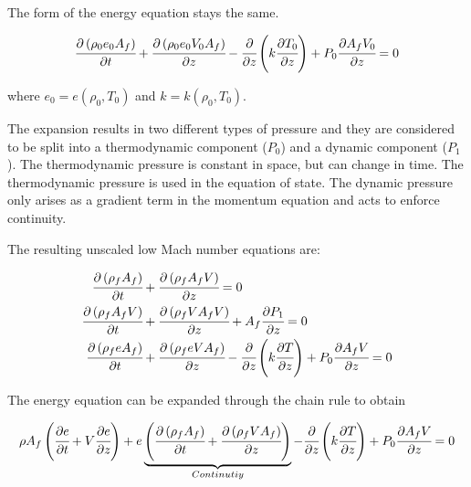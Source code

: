 \documentclass[../Article_Model_Parameters.tex]{subfiles}
\begin{document}
	The form of the energy equation stays the same. 
	
	{\footnotesize
		\begin{equation*}
			\cfrac{\partial \left( \rho_0 e_0 A_f \right) }{\partial t} + \cfrac{\partial \left( \rho_0 e_0 V_0 A_f \right)}{\partial z} - \cfrac{\partial}{\partial z} \left( k \cfrac{\partial T_0}{\partial z} \right) + P_0 \cfrac{\partial A_f V_0}{\partial z} = 0
		\end{equation*}
	}
	
	where $e_0 = e(\rho_0, T_0)$ and $k=k(\rho_0, T_0)$.
		
	The expansion results in two different types of pressure and they are considered to be split into a thermodynamic component ($P_0$) and a dynamic component ($P_1$). The thermodynamic pressure is constant in space, but can change in time. The thermodynamic pressure is used in the equation of state. The dynamic pressure only arises as a gradient term in the momentum equation and acts to enforce continuity.
	
	The resulting unscaled low Mach number equations are:
	
	{\footnotesize
		\begin{align*}
			\cfrac{\partial \left( \rho_f A_f \right)}{\partial t} &+ \cfrac{\partial \left( \rho_f A_f V \right)}{\partial z} = 0 \\
			\cfrac{\partial \left( \rho_f A_f V \right) }{\partial t}	&+ \cfrac{\partial \left( \rho_f V A_f V \right)}{\partial z} + A_f \cfrac{\partial P_1}{\partial z} = 0\\
			\cfrac{\partial \left( \rho_f e A_f \right) }{\partial t} &+ \cfrac{\partial \left( \rho_f e V A_f \right)}{\partial z} - \cfrac{\partial}{\partial z} \left( k \cfrac{\partial T}{\partial z} \right) + P_0 \cfrac{\partial A_f V}{\partial z} = 0
		\end{align*}
	}
	
	The energy equation can be expanded through the chain rule to obtain
	
	{\footnotesize
		\begin{equation*}
			 \rho A_f \left( \cfrac{\partial e }{\partial t} + V \cfrac{\partial e}{\partial z} \right) + e  \underbrace{ \left( \cfrac{\partial \left( \rho_f A_f \right) }{\partial t} + \cfrac{\partial \left( \rho_f V A_f \right)}{\partial z} \right) }_{Continutiy}  - \cfrac{\partial}{\partial z} \left( k \cfrac{\partial T}{\partial z} \right) + P_0 \cfrac{\partial A_f V}{\partial z} = 0
		\end{equation*}
	}
\end{document}
